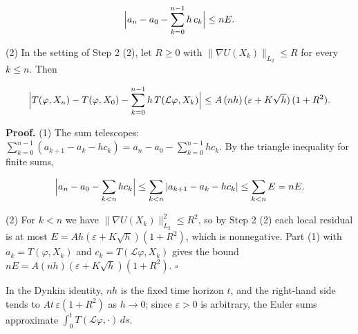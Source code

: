 \documentclass[11pt,a4paper]{article}
\begin{document}
\[\Bigl|a_n-a_0-\sum_{k=0}^{n-1}h\,c_k\Bigr|\le nE.\]


(2) In the setting of Step 2 (2), let \(R\ge0\) with \(\|\nabla U(X_k)\|_{L_2}\le R\) for every \(k\le n\). Then


\[\Bigl|T(\varphi,X_n)-T(\varphi,X_0)-\sum_{k=0}^{n-1}h\,T(\mathcal L\varphi,X_k)\Bigr|\le A\,(nh)\,(\varepsilon+K\sqrt h)\,(1+R^2).\]


\textbf{Proof.} (1) The sum telescopes: \(\sum_{k=0}^{n-1}(a_{k+1}-a_k-hc_k)=a_n-a_0-\sum_{k=0}^{n-1}hc_k\). By the triangle inequality for finite sums,


\[\Bigl|a_n-a_0-\sum_{k<n}hc_k\Bigr|\le\sum_{k<n}|a_{k+1}-a_k-hc_k|\le\sum_{k<n}E=nE.\]


(2) For \(k<n\) we have \(\|\nabla U(X_k)\|_{L_2}^2\le R^2\), so by Step 2 (2) each local residual is at most \(E=Ah(\varepsilon+K\sqrt h)(1+R^2)\), which is nonnegative. Part (1) with \(a_k=T(\varphi,X_k)\) and \(c_k=T(\mathcal L\varphi,X_k)\) gives the bound \(nE=A(nh)(\varepsilon+K\sqrt h)(1+R^2)\). \(\square\)




In the Dynkin identity, \(nh\) is the fixed time horizon \(t\), and the right-hand side tends to \(At\,\varepsilon(1+R^2)\) as \(h\to0\); since \(\varepsilon>0\) is arbitrary, the Euler sums approximate \(\int_0^tT(\mathcal L\varphi,\cdot)\,ds\).
\end{document}
